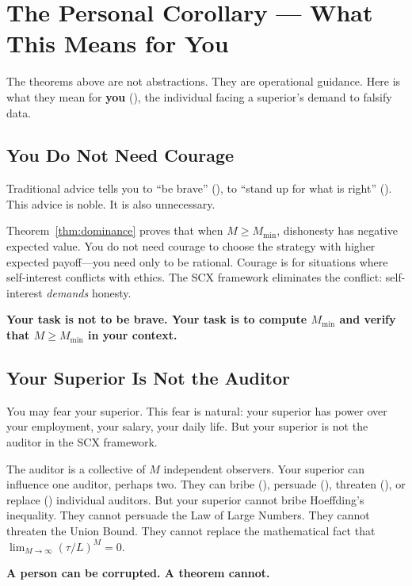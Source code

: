 \documentclass[11pt,a4paper]{article}
\theoremstyle{definition}
\theoremstyle{remark}
\newcommand{\SCX}{\textsc{SCX}}
\newcommand{\threshold}{\tau}
\newcommand{\tol}{L}
\begin{document}
\section{The Personal Corollary --- What This Means for You }
\label{sec:corollary}

The theorems above are not abstractions. They are operational guidance. Here is what they mean for \textbf{you} (), the individual facing a superior's demand to falsify data.

\subsection{You Do Not Need Courage }

Traditional advice tells you to ``be brave'' (), to ``stand up for what is right'' (). This advice is noble. It is also unnecessary.

Theorem~\ref{thm:dominance} proves that when $M \geq M_{\min}$, dishonesty has negative expected value. You do not need courage to choose the strategy with higher expected payoff---you need only to be rational. Courage is for situations where self-interest conflicts with ethics. The \SCX{} framework eliminates the conflict: self-interest \emph{demands} honesty.

\textbf{Your task is not to be brave. Your task is to compute $M_{\min}$ and verify that $M \geq M_{\min}$ in your context.}

\subsection{Your Superior Is Not the Auditor }

You may fear your superior. This fear is natural: your superior has power over your employment, your salary, your daily life. But your superior is not the auditor in the \SCX{} framework.

The auditor is a collective of $M$ independent observers. Your superior can influence one auditor, perhaps two. They can bribe (), persuade (), threaten (), or replace () individual auditors. But your superior cannot bribe Hoeffding's inequality. They cannot persuade the Law of Large Numbers. They cannot threaten the Union Bound. They cannot replace the mathematical fact that $\lim_{M \to \infty} (\threshold/\tol)^M = 0$.

\textbf{A person can be corrupted. A theorem cannot.}
\end{document}
